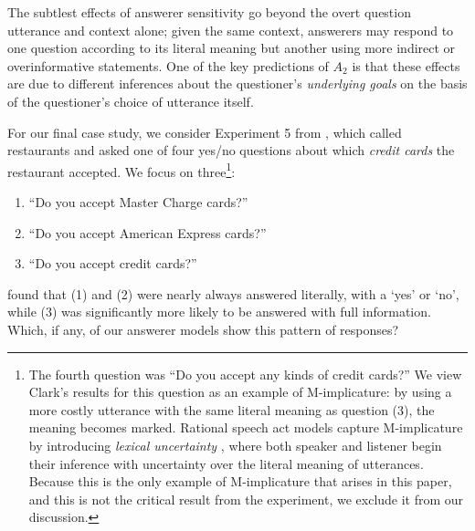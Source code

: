 \documentclass[11pt, floatsintext]{apa6}
\begin{document}
The subtlest effects of answerer sensitivity go beyond the overt question utterance and context alone; given the same context, answerers may respond to one question according to its literal meaning but another using more indirect or overinformative statements. One of the key predictions of  $A_2$ is that these effects are due to different inferences about the questioner's \emph{underlying goals} on the basis of the questioner's choice of utterance itself. 

For our final case study, we consider Experiment 5 from , which called restaurants and asked one of four yes/no questions about which \emph{credit cards} the restaurant accepted. We focus on three\footnote{
The fourth question was ``Do you accept any kinds of credit cards?'' We view Clark's results for this question as an example of M-implicature: by using a more costly utterance with the same literal meaning as question (3), the meaning becomes marked. Rational speech act models capture M-implicature by introducing \emph{lexical uncertainty} \cite{BergenGoodmanLevy12_Alternatives}, where both speaker and listener begin their inference with uncertainty over the literal meaning of utterances. %
Because this is the only example of M-implicature that arises in this paper, and this is not the critical result from the experiment, we exclude it from our discussion.%
}:
\begin{enumerate}
\item ``Do you accept Master Charge cards?'' 
\item ``Do you accept American Express cards?''
\item ``Do you accept credit cards?'' 
\end{enumerate}
 found that (1) and (2) were nearly always answered literally, with a `yes' or `no', while (3) was significantly more likely to be answered with full information. Which, if any, of our answerer models show this pattern of responses? %
\end{document}
